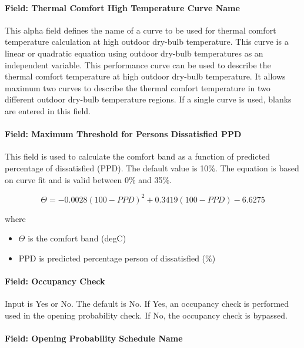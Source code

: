 \paragraph{Field: Thermal Comfort High Temperature Curve Name}\label{field-thermal-comfort-high-temperature-curve-name}

This alpha field defines the name of a curve to be used for thermal comfort temperature calculation at high outdoor dry-bulb temperature. This curve is a linear or quadratic equation using outdoor dry-bulb temperatures as an independent variable. This performance curve can be used to describe the thermal comfort temperature at high outdoor dry-bulb temperature. It allows maximum two curves to describe the thermal comfort temperature in two different outdoor dry-bulb temperature regions. If a single curve is used, blanks are entered in this field.

\paragraph{Field: Maximum Threshold for Persons Dissatisfied PPD}\label{field-maximum-threshold-for-persons-dissatisfied-ppd}

This field is used to calculate the comfort band as a function of predicted percentage of dissatisfied (PPD). The default value is 10\%. The equation is based on curve fit and is valid between 0\% and 35\%.

\begin{equation}
\Theta = -0.0028 (100-PPD)^2 + 0.3419 (100-PPD) - 6.6275
\end{equation}

where

\begin{itemize}
\tightlist
\item
  \(\Theta\) is the comfort band (degC)
\item
  PPD is predicted percentage person of dissatisfied (\%)
\end{itemize}

\paragraph{Field: Occupancy Check}\label{field-occupancy-check}

Input is Yes or No. The default is No. If Yes, an occupancy check is performed used in the opening probability check. If No, the occupancy check is bypassed.

\paragraph{Field: Opening Probability Schedule Name}\label{field-opening-probability-schedule-name}

